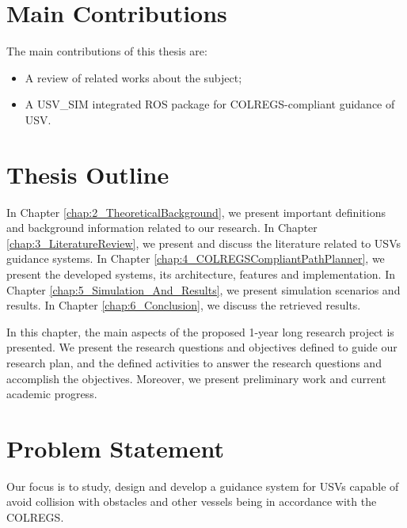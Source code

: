     \section{Main Contributions}
    
    The main contributions of this thesis are:
    \begin{itemize}
        \item A review of related works about the subject;
        \item A USV\_SIM integrated ROS package for COLREGS-compliant guidance of \ac{USV}.
    \end{itemize}

    \section{Thesis Outline}
    
    In Chapter \ref{chap:2_TheoreticalBackground}, we present important definitions and background information related to our research. In Chapter \ref{chap:3_LiteratureReview}, we present and discuss the literature related to \acp{USV} guidance systems. 
    In Chapter \ref{chap:4_COLREGSCompliantPathPlanner}, we present the developed systems, its architecture, features and implementation. In Chapter \ref{chap:5_Simulation_And_Results}, we present simulation scenarios and results. In Chapter \ref{chap:6_Conclusion}, we discuss the retrieved results.
    
    
    In this chapter, the main aspects of the proposed 1-year long research project is presented. We present the research questions and objectives defined to guide our research plan, and the defined activities to answer the research questions and accomplish the objectives. Moreover, we present preliminary work and current academic progress.
    
    \section{Problem Statement}
    \label{sec:problem_statement}

    Our focus is to study, design and develop a guidance system for \acfp{USV} capable of avoid collision with obstacles and other vessels being in accordance with the \ac{COLREGS}.

